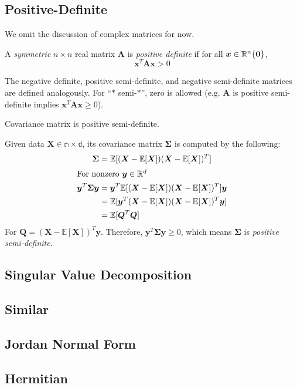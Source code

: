 \subsection{Positive-Definite}
We omit the discussion of complex matrices for now.
\begin{definition}
A \emph{symmetric} $n\times n$ real matrix $\bm{A}$ is \emph{positive definite} if for all $\bm{x}\in\mathbb{R}^n \\ \{\bm{0}\}$, 
\begin{equation}
    \bm{x}^T\bm{Ax} > 0
\end{equation}
\end{definition}
 The negative definite, positive semi-definite, and negative semi-definite matrices are defined analogously. For ``$*$ semi-$*$'', zero is allowed (e.g. $\bm{A}$ is positive semi-definite implies $\bm{x}^T\bm{Ax}\geq 0$).
\begin{theorem}
Covariance matrix is positive semi-definite.
\end{theorem}
\noindent Given data $\bm{X}\in\mathbb{n\times d}$, its covariance matrix $\bm{\Sigma}$ is computed by the following:
\begin{align}
    \bm{\Sigma}&=\mathbb{E}[(\bm{X}-\mathbb{E}[\bm{X}])(\bm{X}-\mathbb{E}[\bm{X}])^T]\\
    \intertext{For nonzero $\bm{y}\in\mathbb{R}^d$}
    \bm{y}^T\bm{\Sigma y} &=  \bm{y}^T\mathbb{E}[(\bm{X}-\mathbb{E}[\bm{X}])(\bm{X}-\mathbb{E}[\bm{X}])^T]\bm{y}\\
    &=  \mathbb{E}[\bm{y}^T(\bm{X}-\mathbb{E}[\bm{X}])(\bm{X}-\mathbb{E}[\bm{X}])^T\bm{y}]\\
    &=  \mathbb{E}[\bm{Q}^T\bm{Q}]
\end{align}
For $\bm{Q}=(\bm{X}-\mathbb{E}[\bm{X}])^T\bm{y}$. Therefore, $\bm{y}^T\bm{\Sigma y}\geq 0$, which means $\bm{\Sigma}$ is \emph{positive semi-definite}.


\subsection{Singular Value Decomposition}

\subsection{Similar}




\subsection{Jordan Normal Form}
\subsection{Hermitian}